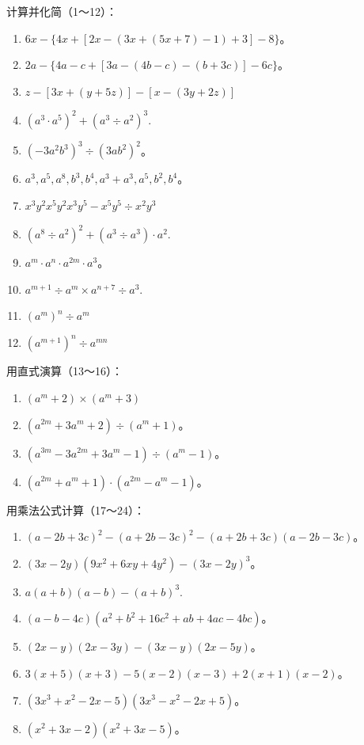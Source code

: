 计算并化简（1～12）：

\begin{enumerate}[start=1]
\item
  \(6x - \{4x + [2x - (3x + (5x + 7) - 1) + 3] - 8\}\)。
\item
  \(2a - \{4a - c + [3a - (4b - c) - (b + 3c)] - 6c\}\)。
\item
  \(z - [3x + (y + 5z)] - [x - (3y + 2z)]\)
\item
  \((a^3\cdot a^5)^2 +(a^3\div a^2)^3.\)
\item
  \((-3a^{2}b^{3})^{3}\div (3ab^{2})^{2}\)。
\item
  \(a^3, a^5, a^8, b^3, b^4, a^3 + a^3, a^5, b^2, b^4\)。
\item
  \(x^{3}y^{2}x^{5}y^{2}x^{3}y^{5} - x^{5}y^{5}\div x^{2}y^{3}\)
\item
  \((a^8\div a^2)^2 +(a^3\div a^3)\cdot a^2.\)
\item
  \(a^m \cdot a^n \cdot a^{2m} \cdot a^3\)。
\item
  \(a^{m + 1}\div a^m\times a^{n + 7}\div a^3.\)
\item
  \((a^{m})^{n}\div a^{m}\)
\item
  \((a^{m + 1})^{n}\div a^{mn}\)
\end{enumerate}

用直式演算（13～16）：

\begin{enumerate}[start=13]
\item
  \((a^{m} + 2)\times (a^{m} + 3)\)
\item
  \((a^{2m} + 3a^m + 2) \div (a^m + 1)\)。
\item
  \((a^{3m} - 3a^{2m} + 3a^m - 1) \div (a^m - 1)\)。
\item
  \((a^{2m} + a^m + 1) \cdot (a^{2m} - a^m - 1)\)。
\end{enumerate}

用乘法公式计算（17～24）：

\begin{enumerate}[start=17]
\item
  \((a - 2b + 3c)^{2} - (a + 2b - 3c)^{2} - (a + 2b + 3c)(a - 2b - 3c)\)。
\item
  \((3x - 2y)(9x^{2} + 6xy + 4y^{2}) - (3x - 2y)^{3}\)。
\item
  \(a(a + b)(a - b) - (a + b)^3.\)
\item
  \((a - b - 4c)(a^2 + b^2 + 16c^2 + ab + 4ac - 4bc)\)。
\item
  \((2x - y)(2x - 3y) - (3x - y)(2x - 5y)\)。
\item
  \(3(x + 5)(x + 3) - 5(x - 2)(x - 3) + 2(x + 1)(x - 2)\)。
\item
  \((3x^{3} + x^{2} - 2x - 5)(3x^{3} - x^{2} - 2x + 5)\)。
\item
  \((x^{2} + 3x - 2)(x^{2} + 3x - 5)\)。
\end{enumerate}

